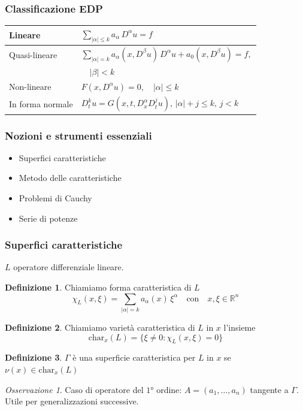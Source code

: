 \documentclass[serif,notheorems]{beamer}
\theoremstyle{definition} %
\newtheorem{definition}{Definizione}[section] %
\theoremstyle{remark}
\newtheorem*{remark}{Osservazione}
\begin{document}
\begin{frame}
\frametitle{Classificazione EDP}
\begin{table}
\renewcommand{\arraystretch}{2}
\begin{tabular}{l l} 
\hline \hline
 Lineare & $\sum_{|\alpha |\leq k} a_\alpha \, D^\alpha u = f$ \\
 \hline
 \vspace{-2mm}
 Quasi-lineare & $\sum_{|\alpha |= k} a_\alpha (x,D^\beta u) \, D^\alpha u +  a_0(x,D^\beta u)= f,$\\
 & $\quad |\beta |<k $ \\
 \hline
 Non-lineare & $F(x,D^\alpha u)=0, \quad |\alpha | \leq k$ \\
 \hline
 In forma normale & $D_{t}^k u = G(x,t, D^\alpha_x D^j_t u), \, |\alpha |+j \leq k, \, j < k$ \\
 \hline \hline
\end{tabular}
\end{table}
\end{frame}

\begin{frame}
\frametitle{Nozioni e strumenti essenziali}
\begin{itemize}
\item Superfici caratteristiche
\item Metodo delle caratteristiche
\item Problemi di Cauchy
\item Serie di potenze
\end{itemize}
\end{frame}

\begin{frame}
\frametitle{Superfici caratteristiche}
$L$ operatore differenziale lineare.
\begin{definition}
Chiamiamo forma caratteristica di $L$
$$\chi_L(x,\xi)=\sum\limits_{|\alpha |= k} a_\alpha(x) \, \xi^\alpha \quad \text{con} \quad x,\xi \in \mathbb{R}^n$$
\end{definition}

\begin{definition}
Chiamiamo varietà caratteristica di $L$ in $x$ l'insieme
$$\text{char}_x (L)= \{ \xi \neq 0 : \chi_L(x,\xi)=0 \}$$
\end{definition}
\end{frame}

\begin{frame}
\begin{definition}
$\Gamma$ è una superficie caratteristica per $L$ in $x$ se $\nu(x) \in\text{char}_x (L)$
\end{definition}
\begin{remark}
Caso di operatore del $1$° ordine: $A=(a_1,\ldots ,a_n)$ tangente a $\Gamma$.\\
Utile per generalizzazioni successive.
\end{remark}
\end{frame}
\end{document}
